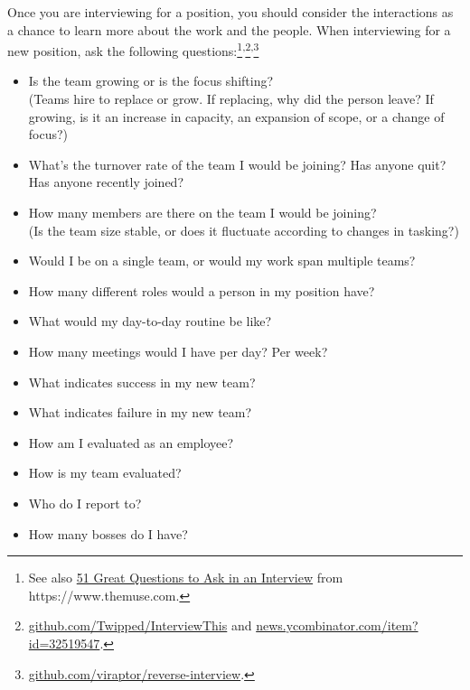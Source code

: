 Once you are interviewing for a position, you should consider the interactions as a chance to learn more about the work and the people. When interviewing for a new position, ask the following questions:\footnote{See also \href{https://www.themuse.com/advice/51-interview-questions-you-should-be-asking}{51 Great Questions to Ask in an Interview} from https://www.themuse.com.}\textsuperscript{,}\footnote{
\href{https://github.com/Twipped/InterviewThis}{github.com/Twipped/InterviewThis} and 
\href{https://news.ycombinator.com/item?id=32519547}{news.ycombinator.com/item?id=32519547}.}\textsuperscript{,}\footnote{
\href{https://github.com/viraptor/reverse-interview}{github.com/viraptor/reverse-interview}.
}
\begin{itemize}
    \item Is the team growing or is the focus shifting? \\
    (Teams hire to replace or grow. If replacing, why did the person leave? If growing, is it an increase in capacity, an expansion of scope, or a change of focus?)
    \item What's the turnover rate of the team I would be joining? Has anyone quit? Has anyone recently joined?
    \item How many members are there on the team I would be joining?\\
    (Is the team size stable, or does it fluctuate according to changes in tasking?)
    \item Would I be on a single team, or would my work span multiple teams?
    \item How many different roles would a person in my position have? 
    
    \item What would my day-to-day routine be like?
    \item How many meetings would I have per day? Per week?

    \item What indicates success in my new team? 
    \item What indicates failure in my new team? 
    \item How am I evaluated as an employee?
    \item How is my team evaluated?

    \item Who do I report to? 
    \item How many bosses do I have?


\end{itemize}

